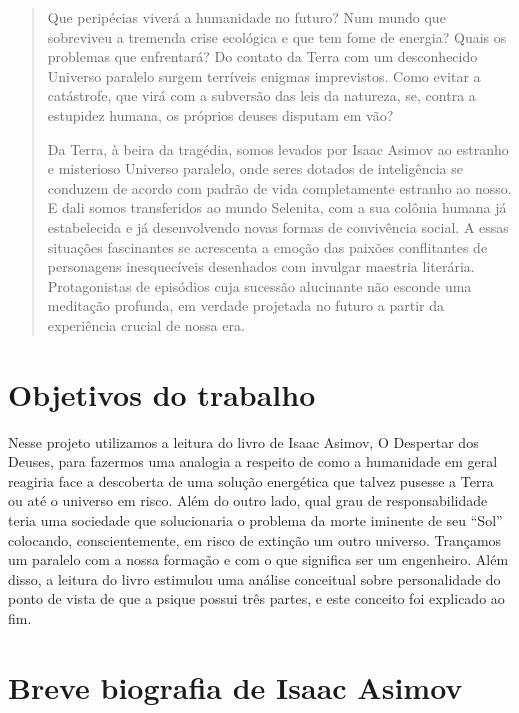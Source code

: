 \documentclass[14pt,portuguese]{extreport}
\begin{document}
      \begin{quotation}
	Que peripécias viverá a humanidade no futuro? Num mundo que sobreviveu a
	tremenda crise ecológica e que tem fome de energia? Quais os problemas que
	enfrentará? Do contato da Terra com um desconhecido Universo paralelo
	surgem terríveis enigmas imprevistos. Como evitar a catástrofe, que virá com a
	subversão das leis da natureza, se, contra a estupidez humana, os próprios
	deuses disputam em vão?
	
	Da Terra, à beira da tragédia, somos levados por Isaac Asimov ao estranho e
	misterioso Universo paralelo, onde seres dotados de inteligência se conduzem
	de acordo com padrão de vida completamente estranho ao nosso. E dali somos
	transferidos ao mundo Selenita, com a sua colônia humana já estabelecida e já
	desenvolvendo novas formas de convivência social. A essas situações
	fascinantes se acrescenta a emoção das paixões conflitantes de personagens
	inesquecíveis desenhados com invulgar maestria literária. Protagonistas de
	episódios cuja sucessão alucinante não esconde uma meditação profunda, em
	verdade projetada no futuro a partir da experiência crucial de nossa era.
      \end{quotation}

    \section{Objetivos do trabalho}
    
      Nesse projeto utilizamos a leitura do livro de Isaac Asimov, O
      Despertar dos Deuses, para fazermos uma analogia a respeito de
      como a humanidade em geral reagiria face a descoberta de uma
      solução energética que talvez pusesse a Terra ou até o universo em
      risco. Além do outro lado, qual grau de responsabilidade teria uma
      sociedade que solucionaria o problema da morte iminente de seu
      “Sol” colocando, conscientemente, em risco de extinção um outro
      universo. Trançamos um paralelo com a nossa formação e com o
      que significa ser um engenheiro. Além disso, a leitura do livro
      estimulou uma análise conceitual sobre personalidade do ponto de
      vista de que a psique possui três partes, e este conceito foi
      explicado ao fim.
      
    \section{Breve biografia de Isaac Asimov}
    
\end{document}
